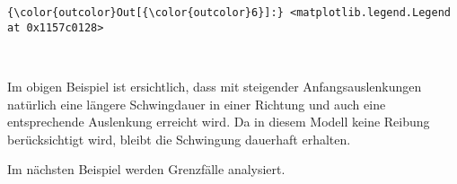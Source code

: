\documentclass[11pt]{article}
\begin{document}
\begin{Verbatim}[commandchars=\\\{\}]
{\color{outcolor}Out[{\color{outcolor}6}]:} <matplotlib.legend.Legend at 0x1157c0128>
\end{Verbatim}
            
    \begin{center}
    \end{center}
    { \hspace*{\fill} \\}
    
    Im obigen Beispiel ist ersichtlich, dass mit steigender
Anfangsauslenkungen natürlich eine längere Schwingdauer in einer
Richtung und auch eine entsprechende Auslenkung erreicht wird. Da in
diesem Modell keine Reibung berücksichtigt wird, bleibt die Schwingung
dauerhaft erhalten.

Im nächsten Beispiel werden Grenzfälle analysiert.
\end{document}
